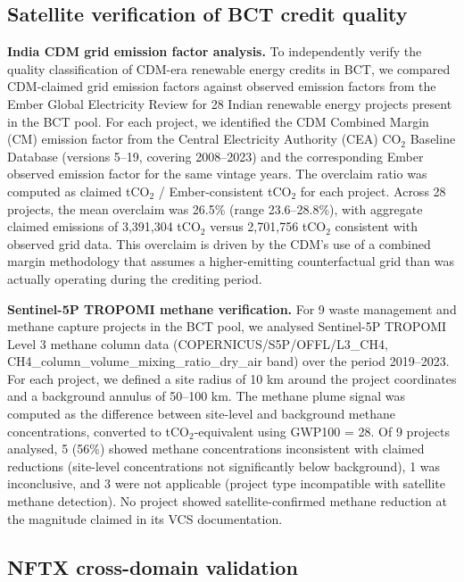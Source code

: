 \documentclass[11pt]{article}
\begin{document}
{\subsection*{Satellite verification of BCT credit quality}

\textbf{India CDM grid emission factor analysis.} To independently verify the quality classification of CDM-era renewable energy credits in BCT, we compared CDM-claimed grid emission factors against observed emission factors from the Ember Global Electricity Review for 28 Indian renewable energy projects present in the BCT pool. For each project, we identified the CDM Combined Margin (CM) emission factor from the Central Electricity Authority (CEA) CO$_2$ Baseline Database (versions 5--19, covering 2008--2023) and the corresponding Ember observed emission factor for the same vintage years. The overclaim ratio was computed as claimed tCO$_2$ / Ember-consistent tCO$_2$ for each project. Across 28 projects, the mean overclaim was 26.5\% (range 23.6--28.8\%), with aggregate claimed emissions of 3,391,304 tCO$_2$ versus 2,701,756 tCO$_2$ consistent with observed grid data. This overclaim is driven by the CDM's use of a combined margin methodology that assumes a higher-emitting counterfactual grid than was actually operating during the crediting period.

\textbf{Sentinel-5P TROPOMI methane verification.} For 9 waste management and methane capture projects in the BCT pool, we analysed Sentinel-5P TROPOMI Level 3 methane column data (COPERNICUS/S5P/OFFL/L3\_CH4, CH4\_column\_volume\_mixing\_ratio\_dry\_air band) over the period 2019--2023. For each project, we defined a site radius of 10 km around the project coordinates and a background annulus of 50--100 km. The methane plume signal was computed as the difference between site-level and background methane concentrations, converted to tCO$_2$-equivalent using GWP100 = 28. Of 9 projects analysed, 5 (56\%) showed methane concentrations inconsistent with claimed reductions (site-level concentrations not significantly below background), 1 was inconclusive, and 3 were not applicable (project type incompatible with satellite methane detection). No project showed satellite-confirmed methane reduction at the magnitude claimed in its VCS documentation.

\subsection*{NFTX cross-domain validation}

}
\end{document}
